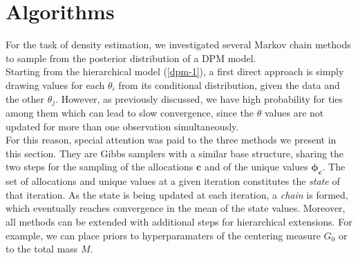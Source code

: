 \section{Algorithms}
For the task of density estimation, we investigated several Markov chain methods to sample from the posterior distribution of a DPM model. \\
Starting from the hierarchical model (\ref{dpm-1}), a first direct approach is simply drawing values for each $\theta_i$ from its conditional distribution, given the data and the other $\theta_j$.
However, as previously discussed, we have high probability for ties among them which can lead to slow convergence, since the $\theta$ values are not updated for more than one observation simultaneously. \\
For this reason, special attention was paid to the three methods we present in this section.
They are Gibbs samplers with a similar base structure, sharing the two steps for the sampling of the allocations $\mathbf{c}$ and of the unique values $\mathbf{\phi_c}$.
The set of allocations and unique values at a given iteration constitutes the \emph{state} of that iteration.
As the state is being updated at each iteration, a \emph{chain} is formed, which eventually reaches convergence in the mean of the state values. %
Moreover, all methods can be extended with additional steps for hierarchical extensions.
For example, we can place priors to hyperparamaters of the centering measure $G_0$ or to the total mass $M$.

